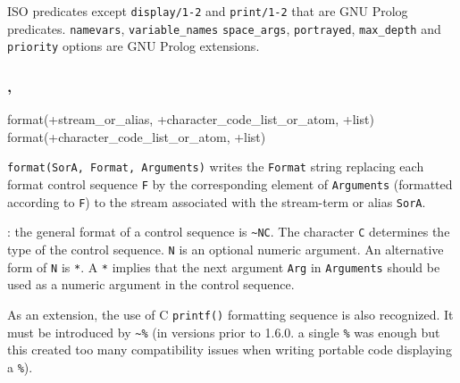 \Portability

ISO predicates except \texttt{display/1-2} and \texttt{print/1-2} that
are GNU Prolog predicates. \texttt{namevars}, \texttt{variable\_names} \texttt{space\_args},
\texttt{portrayed}, \texttt{max\_depth} and \texttt{priority}
options are GNU Prolog extensions.

\subsubsection{,\label{format/3}
               }


\begin{TemplatesOneCol}
format(+stream\_or\_alias, +character\_code\_list\_or\_atom,
+list)\\
format(+character\_code\_list\_or\_atom, +list)

\end{TemplatesOneCol}

\Description

\texttt{format(SorA, Format, Arguments)} writes the \texttt{Format} string
replacing each format control sequence \texttt{F} by the corresponding
element of \texttt{Arguments} (formatted according to \texttt{F}) to the
stream associated with the stream-term or alias \texttt{SorA}.

: the general format of a control sequence is
\texttt{\~{}NC}. The character \texttt{C} determines the type of the
control sequence. \texttt{N} is an optional numeric argument. An alternative
form of \texttt{N} is \texttt{*}. A \texttt{*} implies that the next
argument \texttt{Arg} in \texttt{Arguments} should be used as a numeric
argument in the control sequence.

As an extension, the use of C \texttt{printf()} formatting sequence is also
recognized. It must be introduced by \texttt{\~{}\%} (in versions prior to
1.6.0. a single \texttt{\%} was enough but this created too many
compatibility issues when writing portable code displaying a \texttt{\%}).

